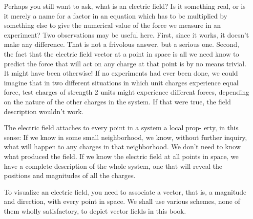 Perhaps you still want to ask, what is an electric field? Is it something
real, or is it merely a name for a factor in an equation which has
to be multiplied by something else to give the numerical value of the
force we measure in an experiment? Two observations may be useful
here. First, since it works, it doesn't make any difference. That
is not a frivolous answer, but a serious one. Second, the fact that
the electric field vector at a point in space is all we need know to
predict the force that will act on any charge at that point is by no
means trivial. It might have been otherwise! If no experiments
had ever been done, we could imagine that in two different situations
in which unit charges experience equal force, test charges of
strength 2 units might experience different forces, depending on the
nature of the other charges in the system. If that were true, the field
description wouldn't work.

The electric field attaches to every point in a system a local prop-
erty, in this sense: If we know  in some small neighborhood, we
know, without further inquiry, what will happen to any charges in
that neighborhood. We don't need to know what produced the field.
If we know the electric field at all points in space, we have a complete
description of the whole system, one that will reveal the positions
and magnitudes of all the charges.

To visualize an electric field, you need to associate a vector, that is,
a magnitude and direction, with every point in space. We shall use
various schemes, none of them wholly satisfactory, to depict vector
fields in this book.

